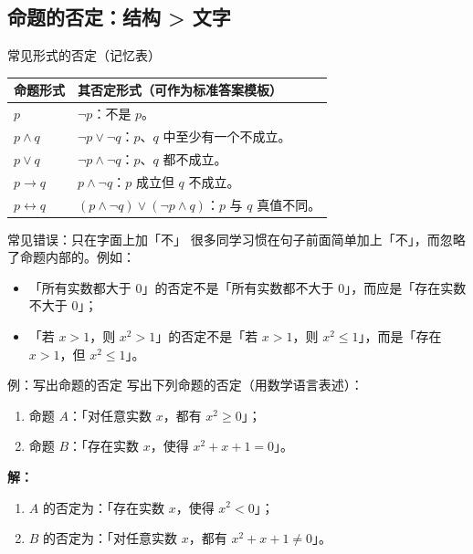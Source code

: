 \documentclass[a4paper,11pt]{ctexart}
\begin{document}
\subsection{命题的否定：结构 > 文字}

\begin{summarybox}{常见形式的否定（记忆表）}
  \begin{center}
  \begin{tabularx}{0.98\textwidth}{>{\raggedright\arraybackslash}p{4.4cm}X}
    \toprule
    \textbf{命题形式} & \textbf{其否定形式（可作为标准答案模板）} \\
    \midrule
    $p$ & $\neg p$：不是 $p$。 \\
    $p\land q$ & $\neg p\lor\neg q$：$p$、$q$ 中至少有一个不成立。 \\
    $p\lor q$ & $\neg p\land\neg q$：$p$、$q$ 都不成立。 \\
    $p\to q$ & $p\land\neg q$：$p$ 成立但 $q$ 不成立。 \\
    $p\leftrightarrow q$ & $(p\land\neg q)\lor(\neg p\land q)$：$p$ 与 $q$ 真值不同。 \\
    \bottomrule
  \end{tabularx}
  \end{center}
\end{summarybox}

\begin{warningbox}{常见错误：只在字面上加「不」}
  很多同学习惯在句子前面简单加上「不」，而忽略了命题内部的。例如：
  \begin{itemize}
    \item 「所有实数都大于 $0$」的否定不是「所有实数都不大于 $0$」，而应是「存在实数不大于 $0$」；
    \item 「若 $x>1$，则 $x^2>1$」的否定不是「若 $x>1$，则 $x^2\le1$」，而是「存在 $x>1$，但 $x^2\le1$」。
  \end{itemize}
\end{warningbox}

\begin{examplebox}{例：写出命题的否定}
  写出下列命题的否定（用数学语言表述）：
  \begin{enumerate}
    \item 命题 $A$：「对任意实数 $x$，都有 $x^2\ge0$」；
    \item 命题 $B$：「存在实数 $x$，使得 $x^2+x+1=0$」。
  \end{enumerate}
  \textbf{解：}
  \begin{enumerate}
    \item $A$ 的否定为：「存在实数 $x$，使得 $x^2<0$」；
    \item $B$ 的否定为：「对任意实数 $x$，都有 $x^2+x+1\ne0$」。
  \end{enumerate}
\end{examplebox}
\end{document}
